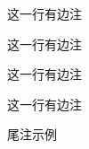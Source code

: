 \documentclass{ctexart}
\begin{document}
            
            

            这一行有边注

            {这一行有边注
            \reversemarginpar
            
            这一行有边注
            
            }

            这一行有边注


            尾注示例
            
\end{document}
